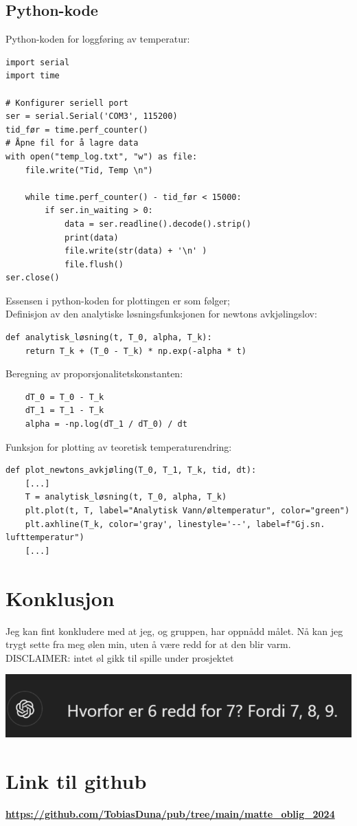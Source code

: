 \documentclass{article}
\begin{document}
\subsection{Python-kode}
Python-koden for loggføring av temperatur:
\begin{verbatim}
import serial
import time

# Konfigurer seriell port
ser = serial.Serial('COM3', 115200)
tid_før = time.perf_counter()
# Åpne fil for å lagre data
with open("temp_log.txt", "w") as file:
    file.write("Tid, Temp \n")

    while time.perf_counter() - tid_før < 15000:
        if ser.in_waiting > 0:
            data = ser.readline().decode().strip()
            print(data)
            file.write(str(data) + '\n' )
            file.flush()
ser.close()
\end{verbatim}
Essensen i python-koden for plottingen er som følger;\\
Definisjon av den analytiske løsningsfunksjonen for newtons avkjølingslov:
\begin{verbatim}
def analytisk_løsning(t, T_0, alpha, T_k):
    return T_k + (T_0 - T_k) * np.exp(-alpha * t)
\end{verbatim}
Beregning av proporsjonalitetskonstanten:
\begin{verbatim}
    dT_0 = T_0 - T_k
    dT_1 = T_1 - T_k
    alpha = -np.log(dT_1 / dT_0) / dt
\end{verbatim}
Funksjon for plotting av teoretisk temperaturendring:
\begin{verbatim}
def plot_newtons_avkjøling(T_0, T_1, T_k, tid, dt): 
    [...]
    T = analytisk_løsning(t, T_0, alpha, T_k)
    plt.plot(t, T, label="Analytisk Vann/øltemperatur", color="green")
    plt.axhline(T_k, color='gray', linestyle='--', label=f"Gj.sn. lufttemperatur")
    [...]
\end{verbatim}

\section{Konklusjon}
Jeg kan fint konkludere med at jeg, og gruppen, har oppnådd målet. Nå kan jeg trygt sette fra meg ølen min, uten å være redd for at den blir varm.
\vfill
DISCLAIMER: intet øl gikk til spille under prosjektet

\begin{center}
    \includegraphics{GPT_math_joke.png}
\end{center}

\appendix
\small \section{Link til github}
\label{github}
\textbf{\url{https://github.com/TobiasDuna/pub/tree/main/matte_oblig_2024}}
\end{document}
